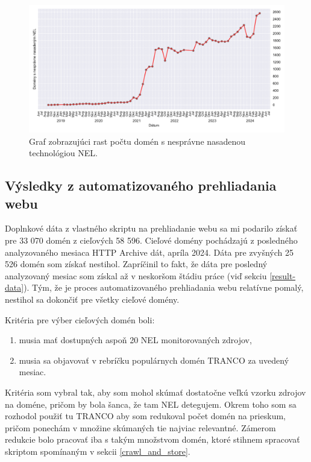 \begin{figure}[!htb]
\begin{center}
 \includegraphics[scale=0.59]{obrazky-figures/httparchive_nel_deployment_incorrect.pdf}
 \caption{Graf zobrazujúci rast počtu domén s nesprávne nasadenou technológiou NEL.}
 \label{fig:httparchive-nel-deployment-incorrect}
\end{center}
\end{figure}


\subsection{Výsledky z automatizovaného prehliadania webu}
\label{crawling-results}

Doplnkové dáta z vlastného skriptu na prehliadanie webu sa mi podarilo získať pre 33 070 domén z cieľových 58 596. 
Cieľové domény pochádzajú z posledného analyzovaného mesiaca HTTP Archive dát, apríla 2024.
Dáta pre zvyšných 25 526 domén som získať nestihol.
Zapríčinil to fakt, že dáta pre posledný analyzovaný mesiac som získal až v neskoršom štádiu práce (viď sekciu \ref{result-data}).
Tým, že je proces automatizovaného prehliadania webu relatívne pomalý, nestihol sa dokončiť pre všetky cieľové domény. 

\pagebreak

\noindent Kritéria pre výber cieľových domén boli:
\begin{enumerate}
    \item musia mať dostupných aspoň 20 NEL monitorovaných zdrojov,
    \item musia sa objavovať v rebríčku populárnych domén TRANCO za uvedený mesiac.
\end{enumerate}
Kritéria som vybral tak, aby som mohol skúmať dostatočne veľkú vzorku zdrojov na doméne, pričom by bola šanca, že tam NEL detegujem.
Okrem toho som sa rozhodol použiť tu TRANCO aby som redukoval počet domén na prieskum, pričom ponechám v množine skúmaných tie najviac relevantné.
Zámerom redukcie bolo pracovať iba s takým množstvom domén, ktoré stihnem spracovať skriptom spomínaným v sekcii \ref{crawl_and_store}.

